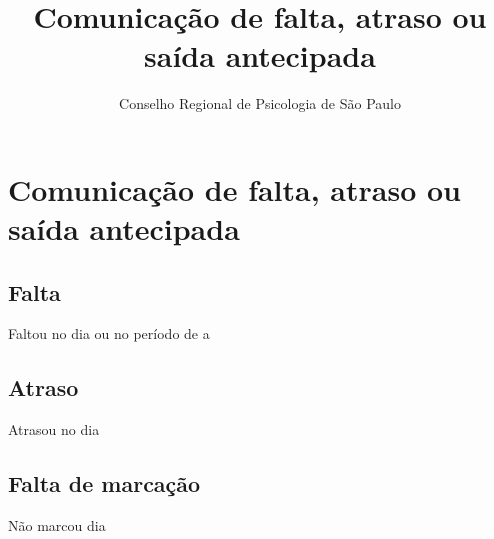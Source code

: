 \documentclass[openright, oneside, a4paper, article, brazil]{abntex2}
\title{Comunicação de falta, atraso ou saída antecipada}
\author{Conselho Regional de Psicologia de São Paulo}
\begin{document}
\pagestyle{crp}
\centering
\Form
\section{Comunicação de falta, atraso ou saída antecipada}%
\vfill
\setasuspacing{\DoubleSpacing}\justifying

 \hfill {}
\vfill

\setasuspacing{\SingleSpacing}
\begin{framed}%
    \centering\vspace*{-3ex}
    \subsection{Falta}
    \noindent\small Faltou no dia  ou no período de  a 
\end{framed}
\begin{framed}%
    \centering\vspace*{-3ex}
    \subsection{Atraso}
    \noindent\small Atrasou no dia  \hfill {}
\end{framed}
\begin{framed}%
    \centering\vspace*{-3ex}
    \subsection{Falta de marcação}
    \noindent\small Não marcou dia 
    \vspace{\baselineskip}

    \footnotesize
    \begin{minipage}{0.25\linewidth}
    \end{minipage}%
    \begin{minipage}{0.25\linewidth}
    \end{minipage}%
    \begin{minipage}{0.25\linewidth}
    \end{minipage}%
    \begin{minipage}{0.25\linewidth}
    \end{minipage}%
\end{framed}
\vspace{\baselineskip}
\end{document}
